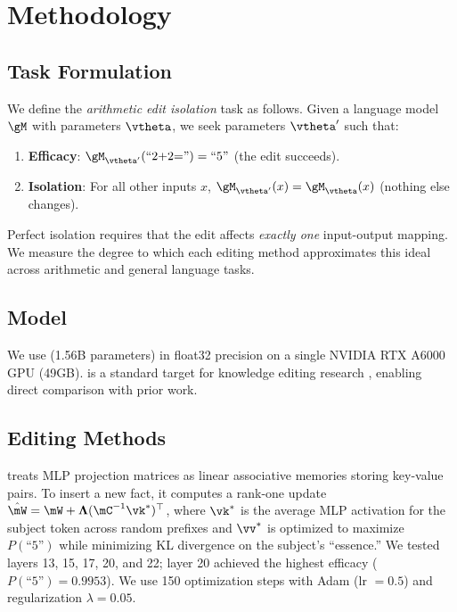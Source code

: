 \section{Methodology}
\label{sec:method}

\subsection{Task Formulation}

We define the \emph{arithmetic edit isolation} task as follows.
Given a language model $\gM$ with parameters $\vtheta$, we seek parameters $\vtheta'$ such that:
\begin{enumerate}[leftmargin=*,itemsep=0pt,topsep=0pt]
    \item \textbf{Efficacy}: $\gM_{\vtheta'}(\text{``2+2=''}) = \text{``5''}$ (the edit succeeds).
    \item \textbf{Isolation}: For all other inputs $x$, $\gM_{\vtheta'}(x) = \gM_{\vtheta}(x)$ (nothing else changes).
\end{enumerate}
Perfect isolation requires that the edit affects \emph{exactly one} input-output mapping. We measure the degree to which each editing method approximates this ideal across arithmetic and general language tasks.

\subsection{Model}

We use \gptxl (1.56B parameters) in float32 precision on a single NVIDIA RTX A6000 GPU (49GB).
\gptxl is a standard target for knowledge editing research \citep{meng2022rome,meng2023memit}, enabling direct comparison with prior work.

\subsection{Editing Methods}

\rome \citep{meng2022rome} treats MLP projection matrices as linear associative memories storing key-value pairs.
To insert a new fact, it computes a rank-one update $\hat{\mW} = \mW + \boldsymbol{\Lambda} (\mC^{-1} \vk^*)^\top$, where $\vk^*$ is the average MLP activation for the subject token across random prefixes and $\vv^*$ is optimized to maximize $P(\text{``5''})$ while minimizing KL divergence on the subject's ``essence.''
We tested layers 13, 15, 17, 20, and 22; layer 20 achieved the highest efficacy ($P(\text{``5''}) = 0.9953$).
We use 150 optimization steps with Adam (lr $= 0.5$) and regularization $\lambda = 0.05$.

